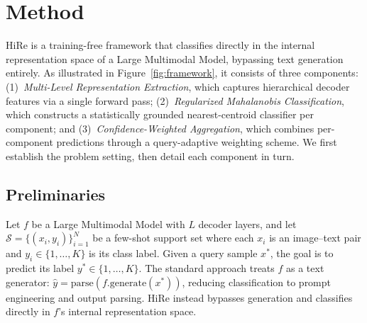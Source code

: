 \documentclass[sigconf,review,anonymous,9pt,table]{acmart}
\begin{document}
\section{Method}

HiRe is a training-free framework that classifies directly in the internal representation space of a Large Multimodal Model, bypassing text generation entirely. As illustrated in Figure~\ref{fig:framework}, it consists of three components: (1)~\emph{Multi-Level Representation Extraction}, which captures hierarchical decoder features via a single forward pass; (2)~\emph{Regularized Mahalanobis Classification}, which constructs a statistically grounded nearest-centroid classifier per component; and (3)~\emph{Confidence-Weighted Aggregation}, which combines per-component predictions through a query-adaptive weighting scheme. We first establish the problem setting, then detail each component in turn.

\subsection{Preliminaries}

Let $f$ be a Large Multimodal Model with $L$ decoder layers, and let $\mathcal{S} = \{(x_i, y_i)\}_{i=1}^N$ be a few-shot support set where each $x_i$ is an image–text pair and $y_i \in \{1, \ldots, K\}$ is its class label. Given a query sample $x^*$, the goal is to predict its label $y^* \in \{1, \ldots, K\}$. The standard approach treats $f$ as a text generator: $\hat{y} = \text{parse}(f.\text{generate}(x^*))$, reducing classification to prompt engineering and output parsing. HiRe instead bypasses generation and classifies directly in $f$'s internal representation space.
\end{document}
